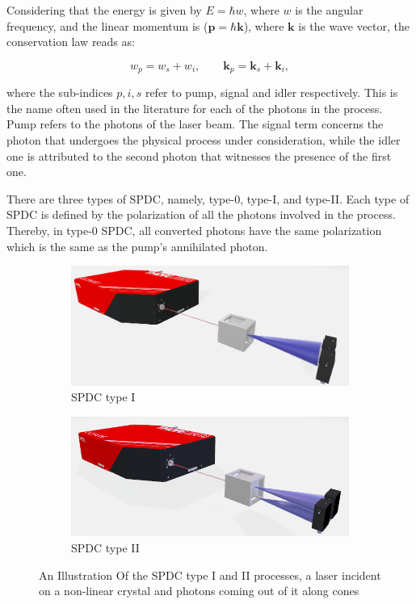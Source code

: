 \documentclass{book}
\begin{document}
Considering that the energy is given by $E=\hbar w$, where $w$ is the angular frequency, and the linear momentum is ($\mathbf{p}=\hbar \mathbf{k}$), where $\mathbf{k}$ is the wave vector, the conservation law reads as:

\begin{equation}
w_{p}=w_{s}+w_{i}, \qquad \mathbf{k}_{p}=\mathbf{k}_{s}+\mathbf{k}_{i}, \label{conservation}
\end{equation}

where the sub-indices $p, i,s$ refer to pump, signal and idler respectively. This is the name often used in the literature for each of the photons in the process. Pump refers to the photons of the laser beam. The signal term concerns the photon that undergoes the physical process under consideration, while the idler one is attributed to the second photon that witnesses the presence of the first one.

There are three types of SPDC, namely, type-0, type-I, and type-II. Each type of SPDC is defined by the polarization of all the photons involved in the process. Thereby, in type-0 SPDC, all converted photons have the same polarization which is the same as the pump's annihilated photon.

\begin{figure}[h!]
\centering
\begin{subfigure}[b]{0.45\linewidth}
\includegraphics[width=\linewidth,height=2.8 cm]{images/TypeI.jpg}
\caption{SPDC type I}
\label{fig:type1}
\end{subfigure}
\begin{subfigure}[b]{0.45\linewidth}
\includegraphics[width=\linewidth,height=2.8 cm]{images/typeII.jpg}
\caption{SPDC type II}
\label{fig:type2}
\end{subfigure}
\caption{An Illustration Of the SPDC type I and II processes, a laser incident on a non-linear crystal and photons coming out of it along cones}
\label{fig:SPDC}
\end{figure}
\end{document}
